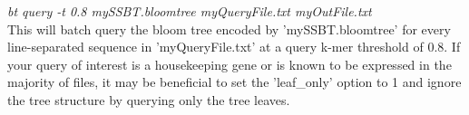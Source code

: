 \documentclass{article}
\begin{document}
\textit{bt query -t 0.8 mySSBT.bloomtree myQueryFile.txt myOutFile.txt} \\

This will batch query the bloom tree encoded by 'mySSBT.bloomtree' for every line-separated sequence in 'myQueryFile.txt' at a query k-mer threshold of 0.8. If your query of interest is a housekeeping gene or is known to be expressed in the majority of files, it may be beneficial to set the 'leaf\_only' option to 1 and ignore the tree structure by querying only the tree leaves. 


%
%
%

%
%
%


\end{document}

